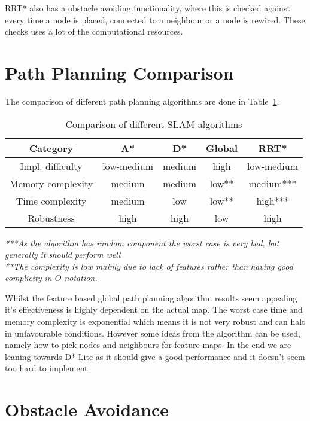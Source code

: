 \documentclass[12pt, a4paper, onecolumn]{article}
\begin{document}
RRT* also has a obstacle avoiding functionality, where this is checked against every time a node is placed, connected to a neighbour or a node is rewired.
These checks uses a lot of the computational resources. \cite{RRT19}

\section{Path Planning Comparison}
The comparison of different path planning algorithms are done in 
Table~\ref{tab:path_algorithms}.
\begin{table}[h!]
  \begin{center}
    \begin{tabular}[c]{|c || c c c c |}
      \hline
       Category        &  A*            & D*      & Global & RRT*    \\
      \hline
      Impl. difficulty & low-medium     & medium  & high   & low-medium \\
      \hline
      Memory complexity & medium        & medium  & low**  & medium*** \\
      \hline
      Time complexity  & medium         & low     & low**  & high*** \\
      \hline
      Robustness       & high           & high    & low    & high \\
      \hline
    \end{tabular}
  \end{center}
  \textit{\small{***As the algorithm has random component the worst case is very bad, but generally it should perform well}}\\
  \textit{\small{**The complexity is low mainly due to lack of features rather than having good complicity in $O$ notation.}}
  \caption{Comparison of different SLAM algorithms}
  \label{tab:path_algorithms}
\end{table} 


Whilst the feature based global path planning algorithm results seem appealing it's effectiveness is highly dependent on the actual map.
The worst case time and memory complexity is exponential which means it is not very robust and can halt in unfavourable conditions.
However some ideas from the algorithm can be used, namely how to pick nodes and neighbours for feature maps.
In the end we are leaning towards D* Lite as it should give a good performance and it doesn't seem too hard to implement.

\section{Obstacle Avoidance }
\end{document}
